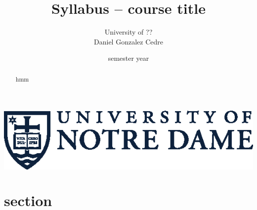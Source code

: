 




\title{Syllabus -- course title}
\author[Daniel Gonzalez Cedre]{University of ?? \\[1ex] Daniel Gonzalez Cedre}
\date{semester year}



\maketitle

\begin{marginfigure}[-39ex]
    \includegraphics[width=\textwidth]{figures/nd-academic-mark.eps}
\end{marginfigure}

\begin{abstract}
    hmm
\end{abstract}

{\hypersetup{hidelinks}\tableofcontents}
\newpage

\section{section}


